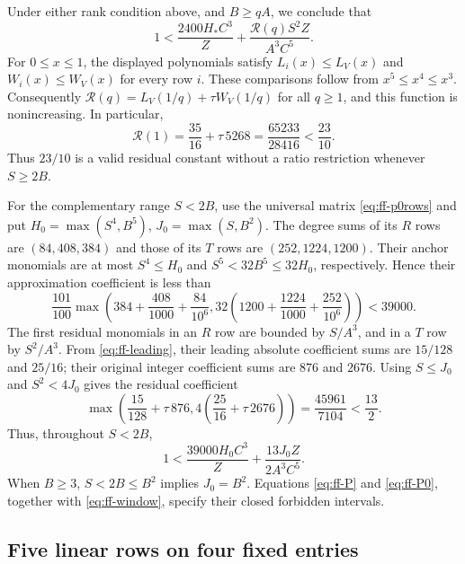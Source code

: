 \documentclass[12pt]{article}
\numberwithin{equation}{section}
\begin{document}
Under either rank condition above, and $B\ge qA$, we conclude that
\begin{equation}\label{eq:ff-P}
 1<\frac{2400H_*C^3}{Z}
       +\frac{\mathcal R(q)S^2Z}{A^3C^5}.
\end{equation}
For $0\le x\le1$, the displayed polynomials satisfy
$L_i(x)\le L_V(x)$ and $W_i(x)\le W_V(x)$ for every row $i$.
These comparisons follow from $x^5\le x^4\le x^3$.
Consequently $\mathcal R(q)=L_V(1/q)+\tau W_V(1/q)$ for all $q\ge1$,
and this function is nonincreasing.
In particular,
\[
 \mathcal R(1)=\frac{35}{16}+\tau\,5268
              =\frac{65233}{28416}<\frac{23}{10}.
\]
Thus $23/10$ is a valid residual constant without a ratio restriction
whenever $S\ge2B$.

For the complementary range $S<2B$, use the universal matrix
\eqref{eq:ff-p0rows} and put
$H_0=\max(S^4,B^5)$, $J_0=\max(S,B^2)$.
The degree sums of its $R$ rows are $(84,408,384)$ and those of its
$T$ rows are $(252,1224,1200)$. Their anchor monomials are at most
$S^4\le H_0$ and $S^5<32B^5\le32H_0$, respectively. Hence their
approximation coefficient is less than
\[
 \frac{101}{100}\max\left(384+\frac{408}{1000}+\frac{84}{10^6},
 32\left(1200+\frac{1224}{1000}+\frac{252}{10^6}\right)\right)
 <39000.
\]
The first residual monomials in an $R$ row are bounded by $S/A^3$,
and in a $T$ row by $S^2/A^3$. From \eqref{eq:ff-leading}, their
leading absolute coefficient sums are $15/128$ and $25/16$; their
original integer coefficient sums are $876$ and $2676$.
Using $S\le J_0$ and $S^2<4J_0$ gives the residual coefficient
\[
 \max\left(\frac{15}{128}+\tau\,876,
       4\left(\frac{25}{16}+\tau\,2676\right)\right)
 =\frac{45961}{7104}<\frac{13}{2}.
\]
Thus, throughout $S<2B$,
\begin{equation}\label{eq:ff-P0}
 1<\frac{39000H_0C^3}{Z}+\frac{13J_0Z}{2A^3C^5}.
\end{equation}
When $B\ge3$, $S<2B\le B^2$ implies $J_0=B^2$.
Equations \eqref{eq:ff-P} and \eqref{eq:ff-P0}, together with
\eqref{eq:ff-window}, specify their closed forbidden intervals.

\subsection{Five linear rows on four fixed entries}
\end{document}
